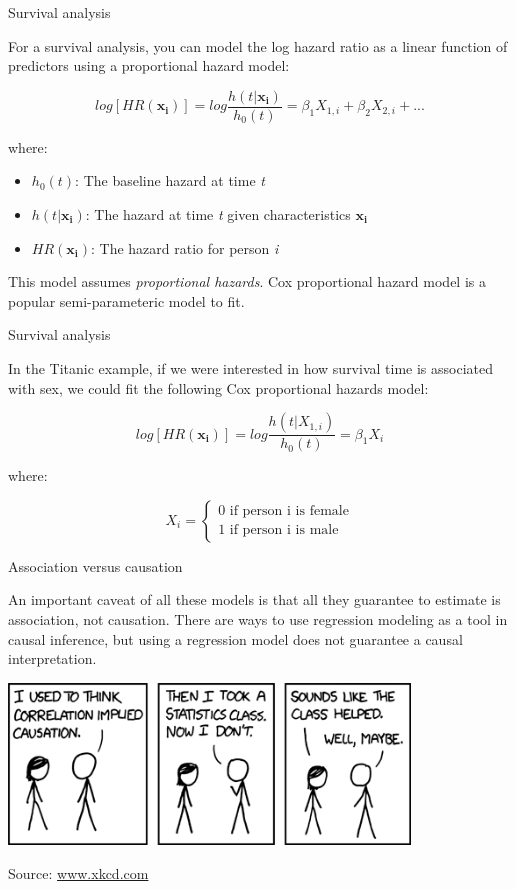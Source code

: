 \documentclass[ignorenonframetext,]{beamer}
\providecommand{\tightlist}{%
  \setlength{\itemsep}{0pt}\setlength{\parskip}{0pt}}
\begin{document}
\begin{frame}{Survival analysis}

For a survival analysis, you can model the log hazard ratio as a linear
function of predictors using a proportional hazard model:

\[
log[HR(\mathbf{x_i})] = log\frac{h(t|\mathbf{x_i})}{h_0(t)} = \beta_1X_{1,i} + \beta_2X_{2,i} + ... 
\]

where:

\begin{itemize}
\tightlist
\item
  \(h_0(t)\): The baseline hazard at time \emph{t}
\item
  \(h(t|\mathbf{x_i})\): The hazard at time \emph{t} given
  characteristics \(\mathbf{x_i}\)
\item
  \(HR(\mathbf{x_i})\): The hazard ratio for person \emph{i}
\end{itemize}

This model assumes \emph{proportional hazards}. Cox proportional hazard
model is a popular semi-parameteric model to fit.

\end{frame}

\begin{frame}{Survival analysis}

In the Titanic example, if we were interested in how survival time is
associated with sex, we could fit the following Cox proportional hazards
model:

\[
log[HR(\mathbf{x_i})] = log\frac{h(t|X_{1,i})}{h_0(t)} = \beta_1X_i 
\]

where:

\[
    X_i=
    \begin{cases}
      0 \text{ if person i is female} \\
      1 \text{ if person i is male}
    \end{cases}
\]

\end{frame}

\begin{frame}{Association versus causation}

An important caveat of all these models is that all they guarantee to
estimate is association, not causation. There are ways to use regression
modeling as a tool in causal inference, but using a regression model
does not guarantee a causal interpretation.

\centering

\includegraphics[width = 0.8\textwidth]{images/correlation.png}

\justifying

\footnotesize{Source: \url{www.xkcd.com}}

\end{frame}
\end{document}
